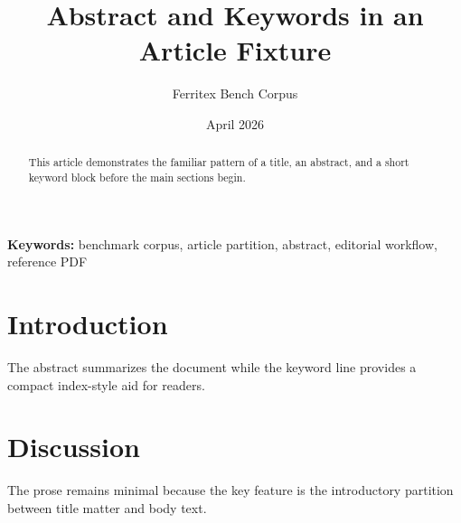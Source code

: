 \documentclass{article}
\title{Abstract and Keywords in an Article Fixture}
\author{Ferritex Bench Corpus}
\date{April 2026}
\begin{document}
\maketitle

\begin{abstract}
This article demonstrates the familiar pattern of a title, an abstract, and
a short keyword block before the main sections begin.
\end{abstract}

\noindent\textbf{Keywords:} benchmark corpus, article partition, abstract,
editorial workflow, reference PDF

\section{Introduction}
The abstract summarizes the document while the keyword line provides a
compact index-style aid for readers.

\section{Discussion}
The prose remains minimal because the key feature is the introductory
partition between title matter and body text.
\end{document}
